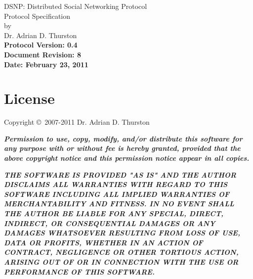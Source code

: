 \documentclass[letterpaper,11pt,oneside]{article}
\begin{document}
%
%

\thispagestyle{empty}
\begin{center}
{\huge DSNP: Distributed Social Networking Protocol}\\
\vspace*{12pt}
{\Large Protocol Specification}\\
\vspace{12pt}
by\\
\vspace{12pt}
{\large Dr. Adrian D. Thurston}\\
\vspace{22pt}
{\noindent\bf\large Protocol Version: 0.4}\\
\vspace{6pt}
{\noindent\bf\large Document Revision: 8}\\
\vspace{6pt}
{\noindent\bf\large Date: February 23, 2011}
\end{center}


\vspace{1.3in}

\section*{License}

Copyright \copyright\ 2007-2011 Dr. Adrian D. Thurston

\vspace{5pt}

{\bf\it\noindent Permission to use, copy, modify, and/or distribute this
software for any purpose with or without fee is hereby granted, provided that
the above copyright notice and this permission notice appear in all copies.}

\vspace{5pt}

{\bf\it\noindent
THE SOFTWARE IS PROVIDED "AS IS" AND THE AUTHOR DISCLAIMS ALL WARRANTIES
WITH REGARD TO THIS SOFTWARE INCLUDING ALL IMPLIED WARRANTIES OF
MERCHANTABILITY AND FITNESS. IN NO EVENT SHALL THE AUTHOR BE LIABLE FOR
ANY SPECIAL, DIRECT, INDIRECT, OR CONSEQUENTIAL DAMAGES OR ANY DAMAGES
WHATSOEVER RESULTING FROM LOSS OF USE, DATA OR PROFITS, WHETHER IN AN
ACTION OF CONTRACT, NEGLIGENCE OR OTHER TORTIOUS ACTION, ARISING OUT OF
OR IN CONNECTION WITH THE USE OR PERFORMANCE OF THIS SOFTWARE.}

\vspace{1.5in}
\end{document}

